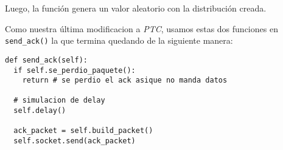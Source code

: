 Luego, la funci\'on  genera un valor aleatorio con la distribuci\'on creada.  

Como nuestra \'ultima modificacion a \emph{PTC}, usamos estas dos funciones en \texttt{send\_ack()} la que termina quedando de la siguiente manera:

\begin{verbatim}
def send_ack(self):
  if self.se_perdio_paquete():
    return # se perdio el ack asique no manda datos

  # simulacion de delay
  self.delay()

  ack_packet = self.build_packet()
  self.socket.send(ack_packet)
\end{verbatim}

